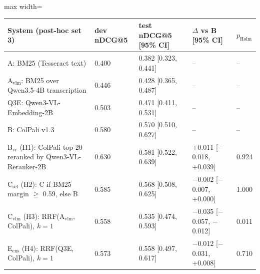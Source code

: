 \begin{adjustbox}{max width=\linewidth}
\begin{tabular}{lllll}
\toprule
System (post-hoc set 3) & dev nDCG@5 & test nDCG@5 [95\% CI] & $\Delta$ vs B [95\% CI] & $p_\mathrm{Holm}$ \\
\midrule
A: BM25 (Tesseract text) & 0.400 & 0.382 [0.323, 0.441] & -- & -- \\
A$_\text{vlm}$: BM25 over Qwen3.5-4B transcription & 0.446 & 0.428 [0.365, 0.487] & -- & -- \\
Q3E: Qwen3-VL-Embedding-2B & 0.503 & 0.471 [0.411, 0.531] & -- & -- \\
B: ColPali v1.3 & 0.580 & 0.570 [0.510, 0.627] & -- & -- \\
B$_\text{vr}$ (H1): ColPali top-20 reranked by Qwen3-VL-Reranker-2B & 0.630 & 0.581 [0.522, 0.639] & +0.011 [$-$0.018, +0.039] & 0.924 \\
C$_\text{sel}$ (H2): C if BM25 margin $\geq$ 0.59, else B & 0.585 & 0.568 [0.508, 0.625] & $-$0.002 [$-$0.007, +0.000] & 1.000 \\
C$_\text{vlm}$ (H3): RRF(A$_\text{vlm}$, ColPali), $k{=}1$ & 0.558 & 0.535 [0.474, 0.593] & $-$0.035 [$-$0.057, $-$0.012] & 0.011 \\
E$_\text{ens}$ (H4): RRF(Q3E, ColPali), $k{=}1$ & 0.573 & 0.558 [0.497, 0.617] & $-$0.012 [$-$0.031, +0.008] & 0.710 \\
\bottomrule
\end{tabular}
\end{adjustbox}
\par{}

